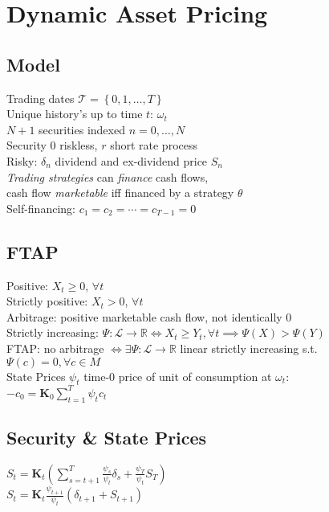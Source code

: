 \section{Dynamic Asset Pricing}
	\subsection*{Model}
	Trading dates $\mathscr{T} = \left\{0, 1, \dots, T\right\}$\\
	Unique history's up to time $t$: $\omega_{t}$\\
	$N + 1$ securities indexed $n = 0, \dots, N$\\
	Security $0$ riskless, $r$ short rate process\\
	Risky: $\delta_{n}$ dividend and ex-dividend price $S_{n}$\\
	\emph{Trading strategies} can \emph{finance} cash flows,\\
	cash flow \emph{marketable} iff financed by a strategy $\theta$\\
	Self-financing: $c_{1} = c_{2} = \cdots = c_{T - 1} = 0$
	
	\subsection*{FTAP}
	Positive: $X_{t}\geq 0$, $\forall t$\\
	Strictly positive: $X_{t} > 0$, $\forall t$\\
	Arbitrage: positive marketable cash flow, not identically 0\\
	Strictly increasing: $\Psi:\mathscr{L}\to\mathbb{R}\iff X_{t}\geq Y_{t},\forall t\implies\Psi\left(X\right) > \Psi\left(Y\right)$\\
	FTAP: no arbitrage $\iff\exists\Psi:\mathscr{L}\to\mathbb{R}$ linear strictly increasing s.t. $\Psi\left(c\right) = 0, \forall c\in M$\\
	State Prices $\psi_{t}$ time-0 price of unit of consumption at $\omega_{t}$:\\
	$-c_{0} = \mathbf{K}_{0}\sum_{t=1}^{T}\psi_{t}c_{t}$
	
	\subsection*{Security \& State Prices}
	$S_{t} = \mathbf{K}_{t}\left(\sum_{s=t+1}^{T}\frac{\psi_{s}}{\psi_{t}}\delta_{s} + \frac{\psi_{T}}{\psi_{t}}S_{T}\right)$\\
	$S_{t} = \mathbf{K}_{t}\frac{\psi_{t+1}}{\psi_{t}}\left(\delta_{t+1} + S_{t+1}\right)$
	
